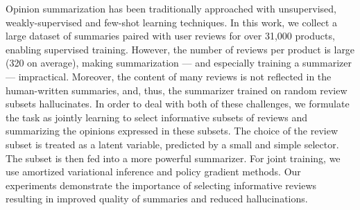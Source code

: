 Opinion summarization has been traditionally approached with unsupervised, weakly-supervised and few-shot learning techniques. In this work, we collect a large dataset of summaries paired with user reviews for over 31,000 products, enabling supervised training. However, the number of reviews per product is large (320 on average), making summarization --- and especially training a summarizer --- impractical. Moreover, the content of many reviews is not reflected in the human-written summaries, and, thus, the summarizer trained on random review subsets hallucinates. In order to deal with both of these challenges, we formulate the task as jointly learning to select informative subsets of reviews and summarizing the opinions expressed in these subsets. The choice of the review subset is treated as a latent variable, predicted by a small and simple selector. The subset is then fed into a more powerful summarizer. For joint training, we use amortized variational inference and policy gradient methods. Our experiments demonstrate the importance of selecting informative reviews resulting in improved quality of summaries and reduced hallucinations.
